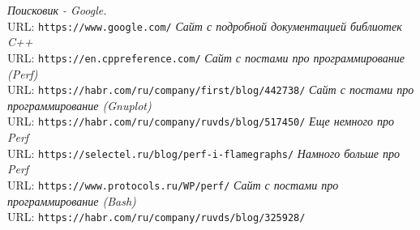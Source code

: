 \begin{thebibliography}{99}
{\itshape Поисковик - Google.} \\URL: \texttt{https://www.google.com/}
{\itshape Сайт с подробной документацией библиотек C++} \\URL: \texttt{https://en.cppreference.com/}
{\itshape Сайт с постами про программирование (Perf)} \\URL: \texttt{https://habr.com/ru/company/first/blog/442738/}
{\itshape Сайт с постами про программирование (Gnuplot)} \\URL: \texttt{https://habr.com/ru/company/ruvds/blog/517450/}
{\itshape Еще немного про Perf} \\URL: \texttt{https://selectel.ru/blog/perf-i-flamegraphs/}
{\itshape Намного больше про Perf} \\URL: \texttt{https://www.protocols.ru/WP/perf/}
{\itshape Сайт с постами про программирование (Bash)} \\URL: \texttt{https://habr.com/ru/company/ruvds/blog/325928/}
\end{thebibliography}
\pagebreak

